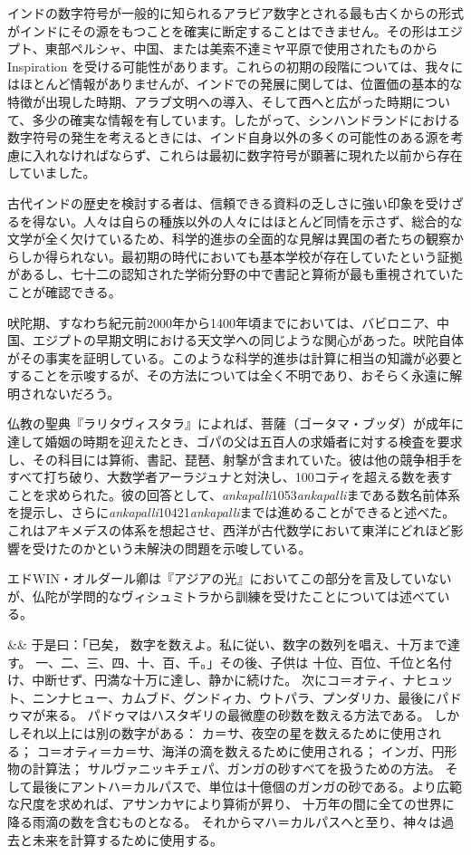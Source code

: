 \documentclass[a4paper,11pt,openany]{ltjsbook}
\begin{document}
インドの数字符号が一般的に知られるアラビア数字とされる最も古くからの形式がインドにその源をもつことを確実に断定することはできません。その形はエジプト、東部ペルシャ、中国、または美索不達ミヤ平原で使用されたものから Inspiration を受ける可能性があります。これらの初期の段階については、我々にはほとんど情報がありませんが、インドでの発展に関しては、位置価の基本的な特徴が出現した時期、アラブ文明への導入、そして西へと広がった時期について、多少の確実な情報を有しています。したがって、シンハンドランドにおける数字符号の発生を考えるときには、インド自身以外の多くの可能性のある源を考慮に入れなければならず、これらは最初に数字符号が顕著に現れた以前から存在していました。

古代インドの歴史を検討する者は、信頼できる資料の乏しさに強い印象を受けざるを得ない。人々は自らの種族以外の人々にはほとんど同情を示さず、総合的な文学が全く欠けているため、科学的進歩の全面的な見解は異国の者たちの観察からしか得られない。最初期の時代においても基本学校が存在していたという証拠があるし、七十二の認知された学術分野の中で書記と算術が最も重視されていたことが確認できる。

吠陀期、すなわち紀元前2000年から1400年頃までにおいては、バビロニア、中国、エジプトの早期文明における天文学への同じような関心があった。吠陀自体がその事実を証明している。このような科学的進歩は計算に相当の知識が必要とすることを示唆するが、その方法については全く不明であり、おそらく永遠に解明されないだろう。

仏教の聖典『ラリタヴィスタラ』によれば、菩薩（ゴータマ・ブッダ）が成年に達して婚姻の時期を迎えたとき、ゴパの父は五百人の求婚者に対する検査を要求し、その科目には算術、書記、琵琶、射撃が含まれていた。彼は他の競争相手をすべて打ち破り、大数学者アーラジュナと対決し、100コティを超える数を表すことを求められた。彼の回答として、\textit{ankapalli}10{53}\textit{ankapalli}まである数名前体系を提示し、さらに\textit{ankapalli}10{421}\textit{ankapalli}までは進めることができると述べた。これはアキメデスの体系を想起させ、西洋が古代数学において東洋にどれほど影響を受けたのかという未解決の問題を示唆している。

エドWIN・オルダール卿は『アジアの光』においてこの部分を言及していないが、仏陀が学問的なヴィシュミトラから訓練を受けたことについては述べている。

\&\&
  于是曰：「已矣，
 数字を数えよ。私に従い、数字の数列を唱え、十万まで達す。
 一、二、三、四、十、百、千。」その後、子供は
 十位、百位、千位と名付け、中断せず、円満な十万に達し、静かに続けた。
 次にコ＝オティ、ナヒュット、ニンナヒュー、カムブド、グンドィカ、ウトパラ、プンダリカ、最後にパドゥマが来る。
 パドゥマはハスタギリの最微塵の砂数を数える方法である。
 しかしそれ以上には別の数字がある：
 カ＝サ、夜空の星を数えるために使用される；
 コ＝オティ＝カ＝サ、海洋の滴を数えるために使用される；
 インガ、円形物の計算法；
 サルヴァニッキチェパ、ガンガの砂すべてを扱うための方法。
 そして最後にアントハ＝カルパスで、単位は十億個のガンガの砂である。より広範な尺度を求めれば、アサンカヤにより算術が昇り、
 十万年の間に全ての世界に降る雨滴の数を含むものとなる。
 それからマハ＝カルパスへと至り、神々は過去と未来を計算するために使用する。
\end{document}
